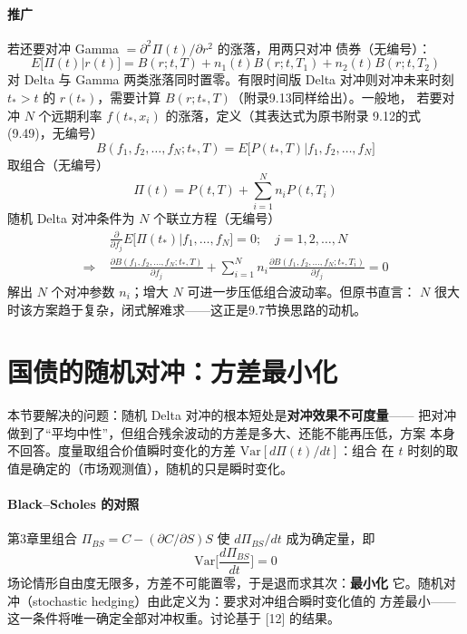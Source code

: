 \paragraph{推广}
若还要对冲 Gamma $=\partial^{2}\Pi(t)/\partial r^{2}$ 的涨落，用两只对冲
债券（无编号）：
\begin{equation*}
E\bigl[\Pi(t)|r(t)\bigr]=B(r;t,T)+n_1(t)B(r;t,T_1)+n_2(t)B(r;t,T_2)
\end{equation*}
对 Delta 与 Gamma 两类涨落同时置零。有限时间版 Delta 对冲则对冲未来时刻
$t_*>t$ 的 $r(t_*)$，需要计算 $B(r;t_*,T)$（附录9.13同样给出）。一般地，
若要对冲 $N$ 个远期利率 $f(t_*,x_i)$ 的涨落，定义（其表达式为原书附录
9.12的式(9.49)，无编号）
\begin{equation*}
B(f_1,f_2,\dots,f_N;t_*,T)
=E\bigl[P(t_*,T)\bigl|f_1,f_2,\dots,f_N\bigr]
\end{equation*}
取组合（无编号）
\begin{equation*}
\Pi(t)=P(t,T)+\sum_{i=1}^{N}n_iP(t,T_i)
\end{equation*}
随机 Delta 对冲条件为 $N$ 个联立方程（无编号）
\begin{align*}
&\frac{\partial}{\partial f_j}E\bigl[\Pi(t_*)|f_1,\dots,f_N\bigr]=0;\quad
j=1,2,\dots,N\\
\Rightarrow\;
&\frac{\partial B(f_1,f_2,\dots,f_N;t_*,T)}{\partial f_j}
+\sum_{i=1}^{N}n_i\frac{\partial B(f_1,f_2,\dots,f_N;t_*,T_i)}
{\partial f_j}=0
\end{align*}
解出 $N$ 个对冲参数 $n_i$；增大 $N$ 可进一步压低组合波动率。但原书直言：
$N$ 很大时该方案趋于复杂，闭式解难求——这正是9.7节换思路的动机。

\section{国债的随机对冲：方差最小化}

本节要解决的问题：随机 Delta 对冲的根本短处是\textbf{对冲效果不可度量}——
把对冲做到了“平均中性”，但组合残余波动的方差是多大、还能不能再压低，方案
本身不回答。度量取组合价值瞬时变化的方差 $\mathrm{Var}[d\Pi(t)/dt]$：组合
在 $t$ 时刻的取值是确定的（市场观测值），随机的只是瞬时变化。

\paragraph{Black--Scholes 的对照}
第3章里组合 $\Pi_{BS}=C-(\partial C/\partial S)S$ 使 $d\Pi_{BS}/dt$
成为确定量，即
\begin{equation*}
\mathrm{Var}\biggl[\frac{d\Pi_{BS}}{dt}\biggr]=0\tag{9.34}
\end{equation*}
场论情形自由度无限多，方差不可能置零，于是退而求其次：\textbf{最小化}
它。随机对冲（stochastic hedging）由此定义为：要求对冲组合瞬时变化值的
方差最小——这一条件将唯一确定全部对冲权重。讨论基于 [12] 的结果。

